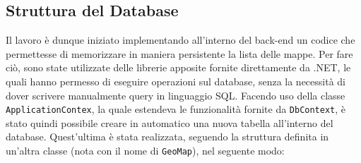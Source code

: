 \subsection{Struttura del Database}

Il lavoro è dunque iniziato implementando all'interno del back-end un codice che permettesse di memorizzare in maniera persistente la lista delle mappe. Per fare ciò, sono state utilizzate delle librerie apposite fornite direttamente da .NET, le quali hanno permesso di eseguire operazioni sul database, senza la necessità di dover scrivere manualmente query in linguaggio SQL. Facendo uso della classe \verb|ApplicationContex|, la quale estendeva le funzionalità fornite da \verb|DbContext|, è stato quindi possibile creare in automatico una nuova tabella all'interno del database. Quest'ultima è stata realizzata, seguendo la struttura definita in un'altra classe (nota con il nome di \verb|GeoMap|), nel seguente modo:
